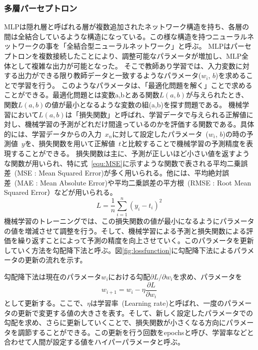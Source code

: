 \subsubsection{多層パーセプトロン}
MLPは隠れ層と呼ばれる層が複数追加されたネットワーク構造を持ち、各層の間は全結合しているような構造になっている。この様な構造を持つニューラルネットワークの事を「全結合型ニューラルネットワーク」と呼ぶ。
MLPはパーセプトロンを複数接続したことにより、調整可能なパラメータが増加し、MLP全体として複雑な出力が可能となった。
そこで教師あり学習では、入力変数に対する出力ができる限り教師データと一致するようなパラメータ($w_i$, $b$)を求めることで学習を行う。
このようなパラメータは、「最適化問題を解く」ことで求めることができる。最適化問題とは変数a,bとある関数$L(a,b)$が与えられたとき、関数$L(a,b)$の値が最小となるような変数の組(a,b)を探す問題である。
機械学習において$L(a,b)$は「損失関数」と呼ばれ、学習データで与えられる正解値に対し、機械学習の予測がどれだけ間違っているのかを評価する関数である。具体的には、学習データからの入力~$x_n$に対して設定したパラメータ~($w_i$, $b$)の時の予測値~$y$を、損失関数を用いて正解値~$t$と比較することで機械学習の予測精度を表現することができる。
損失関数は主に、予測が正しいほど小さい値を返すような関数が用いられ、特に式~\eqref{equ:MSE}に示すような関数で表される平均二乗誤差~(MSE : Mean Squared Error)が多く用いられる。他には、平均絶対誤差~(MAE : Mean Absolute Error)や平均二乗誤差の平方根~(RMSE : Root Mean Squared Error）などが用いられる。
\begin{equation}
    L = \frac{1}{n}\sum^{n}_{i=1}(y_i-t_i)^2
    \label{equ:MSE}
\end{equation}
機械学習のトレーニングでは、この損失関数の値が最小になるようにパラメータの値を増減させて調整を行う。そして、機械学習による予測と損失関数による評価を繰り返すことによって予測の精度を向上させていく。このパラメータを更新していく方法を勾配降下法と呼ぶ。図\ref{fig:lossfunction}に勾配降下法によるパラメータの更新の流れを示す。

勾配降下法は現在のパラメータ$w_i$における勾配${\partial L}/{\partial w_i}$を求め、パラメータを
\begin{equation}
    w_{i+1} = w_i - \eta\frac{\partial L}{\partial w_i}
    \label{equ:勾配}
\end{equation}
として更新する。ここで、$\eta$は学習率~(Learning rate)と呼ばれ、一度のパラメータの更新で変更する値の大きさを表す。そして、新しく設定したパラメータでの勾配を求め、さらに更新していくことで、損失関数が小さくなる方向にパラメータを調節することができる。この更新を行う回数をepochsと呼び、学習率などと合わせて人間が設定する値をハイパーパラメータと呼ぶ。


